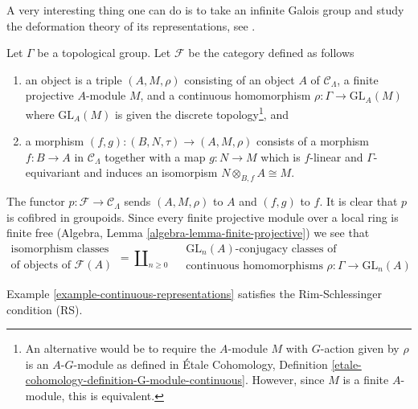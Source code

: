 \noindent
A very interesting thing one can do is to take an infinite Galois
group and study the deformation theory of its representations, see
\cite{Mazur-deforming}.

\begin{example}
\label{example-continuous-representations}
Let $\Gamma$ be a topological group.
Let $\mathcal{F}$ be the category defined as follows
\begin{enumerate}
\item an object is a triple $(A, M, \rho)$ consisting of an
object $A$ of $\mathcal{C}_\Lambda$, a finite projective $A$-module $M$,
and a continuous homomorphism $\rho : \Gamma \to \text{GL}_A(M)$
where $\text{GL}_A(M)$ is given the discrete topology\footnote{An alternative
would be to require the $A$-module $M$ with $G$-action given by $\rho$
is an $A\text{-}G$-module as defined in \'Etale Cohomology, Definition
\ref{etale-cohomology-definition-G-module-continuous}. However,
since $M$ is a finite $A$-module, this is equivalent.}, and
\item a morphism $(f, g) : (B, N, \tau) \to (A, M, \rho)$ consists of
a morphism $f : B \to A$ in $\mathcal{C}_\Lambda$ together
with a map $g : N \to M$ which is $f$-linear and $\Gamma$-equivariant
and induces an isomorpism $N \otimes_{B, f} A \cong M$.
\end{enumerate}
The functor $p : \mathcal{F} \to \mathcal{C}_\Lambda$ sends $(A, M, \rho)$
to $A$ and $(f, g)$ to $f$. It is clear that $p$ is cofibred in groupoids.
Since every finite projective module over a local ring is finite free
(Algebra, Lemma \ref{algebra-lemma-finite-projective})
we see that
$$
\begin{matrix}
\text{isomorphism classes} \\
\text{of objects of }\mathcal{F}(A)
\end{matrix}
=
\coprod\nolimits_{n \geq 0}\quad
\begin{matrix}
\text{GL}_n(A)\text{-conjugacy classes of}\\
\text{continuous homomorphisms }\rho : \Gamma \to \text{GL}_n(A)
\end{matrix}
$$
\end{example}

\begin{lemma}
\label{lemma-continuous-representations-RS}
Example \ref{example-continuous-representations}
satisfies the Rim-Schlessinger condition (RS).
\end{lemma}

